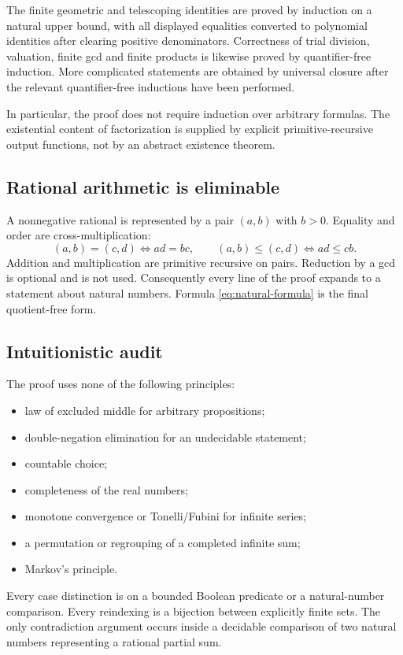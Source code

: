 \documentclass[11pt]{article}
\theoremstyle{definition}
\begin{document}
The finite geometric and telescoping identities are proved by induction on a
natural upper bound, with all displayed equalities converted to polynomial
identities after clearing positive denominators.  Correctness of trial division,
valuation, finite gcd and finite products is likewise proved by
quantifier-free induction.  More complicated statements are obtained by
universal closure after the relevant quantifier-free inductions have been
performed.

In particular, the proof does not require induction over arbitrary formulas.
The existential content of factorization is supplied by explicit
primitive-recursive output functions, not by an abstract existence theorem.

\subsection{Rational arithmetic is eliminable}

A nonnegative rational is represented by a pair $(a,b)$ with $b>0$.
Equality and order are cross-multiplication:
\[
  (a,b)=(c,d)\iff ad=bc,
  \qquad
  (a,b)\le(c,d)\iff ad\le cb.
\]
Addition and multiplication are primitive recursive on pairs.  Reduction by a
gcd is optional and is not used.  Consequently every line of the proof expands
to a statement about natural numbers.  Formula \eqref{eq:natural-formula} is
the final quotient-free form.

\subsection{Intuitionistic audit}

The proof uses none of the following principles:
\begin{itemize}
\item law of excluded middle for arbitrary propositions;
\item double-negation elimination for an undecidable statement;
\item countable choice;
\item completeness of the real numbers;
\item monotone convergence or Tonelli/Fubini for infinite series;
\item a permutation or regrouping of a completed infinite sum;
\item Markov's principle.
\end{itemize}
Every case distinction is on a bounded Boolean predicate or a natural-number
comparison.  Every reindexing is a bijection between explicitly finite sets.
The only contradiction argument occurs inside a decidable comparison of two
natural numbers representing a rational partial sum.
\end{document}
